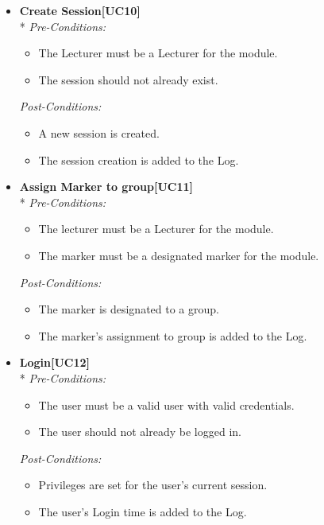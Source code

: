 \documentclass[a4paper]{article}
\begin{document}
\begin{itemize}
				\item	\textbf{Create Session[UC10]}\\*
						\textit{Pre-Conditions:}
								\begin{itemize}
									\item The Lecturer must be a Lecturer for the module.
									\item The session should not already exist.
								\end{itemize}
								
						\textit{Post-Conditions:}
								\begin{itemize}
									\item A new session is created.
									\item The session creation is added to the Log.
								\end{itemize}
														
				\item	\textbf{Assign Marker to group[UC11]}\\*
						\textit{Pre-Conditions:}
								\begin{itemize}
									\item The lecturer must be a Lecturer for the module.
									\item The marker must be a designated marker for the module.
								\end{itemize}
								
						\textit{Post-Conditions:}
								\begin{itemize}
									\item The marker is designated to a group.
									\item The marker's assignment to group is added to the Log.
								\end{itemize}
														
				\item	\textbf{Login[UC12]}\\*
						\textit{Pre-Conditions:}
								\begin{itemize}
									\item The user must be a valid user with valid credentials.
									\item The user should not already be logged in.
								\end{itemize}
								
						\textit{Post-Conditions:}
								\begin{itemize}
									\item Privileges are set for the user's current session.
									\item The user's Login time is added to the Log.
								\end{itemize}
														

\end{itemize}
\end{document}
